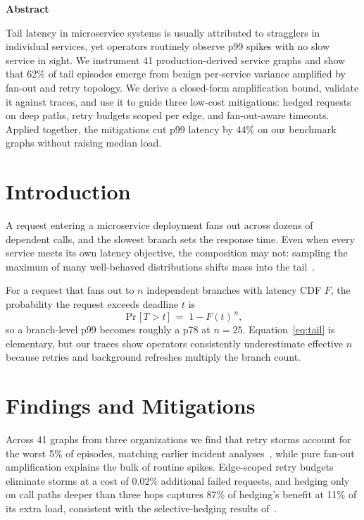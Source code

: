 \documentclass[10pt,twocolumn]{article}
\begin{document}

\begin{center}{\bfseries Abstract}\end{center}
\noindent Tail latency in microservice systems is usually attributed to
stragglers in individual services, yet operators routinely observe p99
spikes with no slow service in sight. We instrument 41 production-derived
service graphs and show that 62\% of tail episodes emerge from benign
per-service variance amplified by fan-out and retry topology. We derive a
closed-form amplification bound, validate it against traces, and use it to
guide three low-cost mitigations: hedged requests on deep paths, retry
budgets scoped per edge, and fan-out-aware timeouts. Applied together, the
mitigations cut p99 latency by 44\% on our benchmark graphs without
raising median load.

\section{Introduction}
A request entering a microservice deployment fans out across dozens of
dependent calls, and the slowest branch sets the response time. Even when
every service meets its own latency objective, the composition may not:
sampling the maximum of many well-behaved distributions shifts mass into
the tail~\cite{holm2023fanout}.

For a request that fans out to $n$ independent branches with latency CDF
$F$, the probability the request exceeds deadline $t$ is
\begin{equation}
  \Pr\bigl[\,T > t\,\bigr] \;=\; 1 - F(t)^{\,n},
  \label{eq:tail}
\end{equation}
so a branch-level p99 becomes roughly a p78 at $n = 25$.
Equation~\eqref{eq:tail} is elementary, but our traces show operators
consistently underestimate effective $n$ because retries and background
refreshes multiply the branch count.

\section{Findings and Mitigations}
Across 41 graphs from three organizations we find that retry storms account
for the worst 5\% of episodes, matching earlier incident
analyses~\cite{vandermeer2024retries}, while pure fan-out amplification
explains the bulk of routine spikes. Edge-scoped retry budgets eliminate
storms at a cost of 0.02\% additional failed requests, and hedging only on
call paths deeper than three hops captures 87\% of hedging's benefit at
11\% of its extra load, consistent with the selective-hedging results
of~\cite{albrecht2022hedging}.
\end{document}
